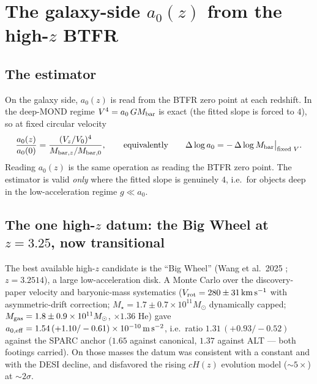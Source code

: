 \documentclass[11pt,a4paper]{article}
\newcommand{\Mbar}{M_{\rm bar}}
\newcommand{\azero}{a_0}
\newcommand{\msms}{{\rm m\,s^{-2}}}
\begin{document}
\section{The galaxy-side $a_0(z)$ from the high-$z$ BTFR}
\label{sec:galaxy}

\subsection{The estimator}

On the galaxy side, $\azero(z)$ is read from the BTFR zero point at each
redshift. In the deep-MOND regime $V^4=\azero\,G\Mbar$ is exact (the fitted
slope is forced to $4$), so at fixed circular velocity
\begin{equation}
\frac{\azero(z)}{\azero(0)}=\frac{(V_z/V_0)^4}{M_{{\rm bar},z}/M_{{\rm bar},0}},
\qquad\text{equivalently}\qquad
\Delta\log \azero=-\,\Delta\log \Mbar\big|_{\text{fixed }V}.
\label{eq:btfr}
\end{equation}
Reading $\azero(z)$ is the same operation as reading the BTFR zero point. The
estimator is valid \emph{only} where the fitted slope is genuinely $4$, i.e.\
for objects deep in the low-acceleration regime $g\ll \azero$.

\subsection{The one high-$z$ datum: the Big Wheel at $z=3.25$, now transitional}
\label{sec:bigwheel}

The best available high-$z$ candidate is the ``Big Wheel'' (Wang et al.\ 2025
\cite{Wang2025}; $z=3.2514$), a large low-acceleration disk. A Monte Carlo
over the discovery-paper velocity and baryonic-mass systematics
($V_{\rm rot}=280\pm31\,{\rm km\,s^{-1}}$ with asymmetric-drift correction;
$M_\star=1.7\pm0.7\times10^{11}M_\odot$ dynamically capped;
$M_{\rm gas}=1.8\pm0.9\times10^{11}M_\odot$, $\times1.36$ He) gave
$a_{0,{\rm eff}}=1.54\,(+1.10/-0.61)\times10^{-10}\,\msms$, i.e.\ ratio
$1.31\,(+0.93/-0.52)$ against the SPARC anchor ($1.65$ against canonical,
$1.37$ against ALT --- both footings carried). On those masses the datum was
consistent with a constant and with the DESI decline, and disfavored the
rising $cH(z)$ evolution model ($\sim5\times$) at $\sim2\sigma$.
\end{document}
